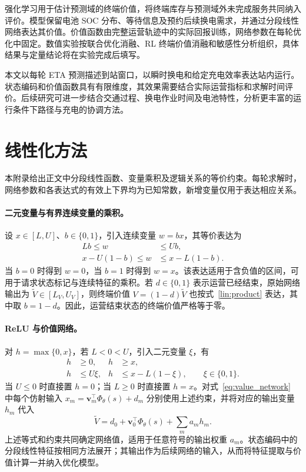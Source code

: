 \documentclass[12pt,a4paper,UTF8]{ctexart}
\numberwithin{equation}{section}
\begin{document}
强化学习用于估计预测域的终端价值，将终端库存与预测域外未完成服务共同纳入评价。模型保留电池 SOC 分布、等待信息及预约后续换电需求，并通过分段线性网络表达其价值。价值函数由完整运营轨迹中的实际回报训练，网络参数在每轮优化中固定。数值实验按联合优化消融、RL 终端价值消融和敏感性分析组织，具体结果与定量结论将在实验完成后填写。

本文以每轮 ETA 预测描述到站窗口，以瞬时换电和给定充电效率表达站内运行。状态编码和价值函数具有有限维度，其效果需要结合实际运营指标和求解时间评价。后续研究可进一步结合交通过程、换电作业时间及电池特性，分析更丰富的运行条件下路径与充电的协调方法。


\appendix
\section{线性化方法}
\label{lin:appendix}

本附录给出正文中分段线性函数、变量乘积及逻辑关系的等价约束。每轮求解时，网络参数和各表达式的有效上下界均为已知常数，新增变量仅用于表达相应关系。

\paragraph{二元变量与有界连续变量的乘积。}
设 $x\in[L,U]$、$b\in\{0,1\}$，引入连续变量 $w=bx$，其等价表达为
\begin{equation}
\begin{aligned}
Lb\le w&\le Ub,\\
x-U(1-b)\le w&\le x-L(1-b).
\end{aligned}
\label{lin:product}
\end{equation}
当 $b=0$ 时得到 $w=0$，当 $b=1$ 时得到 $w=x$。该表达适用于含负值的区间，可用于请求状态标记与连续特征的乘积。若 $d\in\{0,1\}$ 表示运营已经结束，原始网络输出为 $\widetilde V\in[L_V,U_V]$，则终端价值 $V=(1-d)\widetilde V$ 也按式~\eqref{lin:product} 表达，其中取 $b=1-d$。因此，运营结束状态的终端价值严格等于零。

\paragraph{ReLU 与价值网络。}
对 $h=\max\{0,x\}$，若 $L<0<U$，引入二元变量 $\xi$，有
\begin{equation}
\begin{aligned}
h&\ge 0, & h&\ge x,\\
h&\le U\xi, & h&\le x-L(1-\xi),
\qquad \xi\in\{0,1\}.
\end{aligned}
\label{lin:relu}
\end{equation}
当 $U\le0$ 时直接置 $h=0$；当 $L\ge0$ 时直接置 $h=x$。对式~\eqref{eq:value_network} 中每个仿射输入 $x_m=\boldsymbol v_m^\top\Phi_\theta(s)+d_m$ 分别使用上述约束，并将对应的输出变量 $h_m$ 代入
\begin{equation}
\widetilde V=d_0+\boldsymbol v_0^\top\Phi_\theta(s)+\sum_m a_m h_m.
\label{lin:network}
\end{equation}
上述等式和约束共同确定网络值，适用于任意符号的输出权重 $a_m$。状态编码中的分段线性特征按相同方法展开；其输出作为后续网络的输入，从而将特征提取与价值计算一并纳入优化模型。
\end{document}
